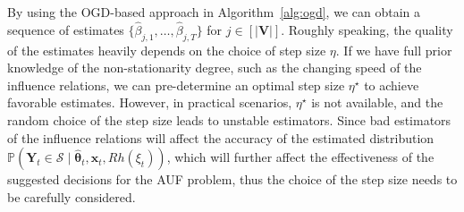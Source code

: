 \documentclass{article}
\theoremstyle{plain}
\theoremstyle{definition}
\theoremstyle{remark}
\def \x {\mathbf{x}}
\def \sB {\mathcal{B}}
\def \V {\mathbf{V}}
\def \sS {\mathcal{S}}
\def \Y {\mathbf{Y}}
\def \PA {\operatorname{PA}}
\def \V {\mathbf{V}}
\begin{document}
By using the OGD-based approach in Algorithm~\ref{alg:ogd}, we can obtain a sequence of estimates $\{\hat{\beta}_{j, 1}, \ldots, \hat{\beta}_{j, T}\}$ for $j\in[|\V|]$. 
Roughly speaking, the quality of the estimates heavily depends on the choice of step size $\eta$. 
If we have full prior knowledge of the non-stationarity degree, such as the changing speed of the influence relations, 
we can pre-determine an optimal step size $\eta^\star$ to achieve favorable estimates. 
However, in practical scenarios, $\eta^\star$ is not available, and the random choice of the step size leads to unstable estimators. 
Since bad estimators of the influence relations will affect the accuracy of the estimated distribution $\mathbb{P}(\Y_t\in\sS \mid \hat{\bm{\theta}}_t, \x_t, Rh(\xi_t))$, 
which will further affect the effectiveness of the suggested decisions for the AUF problem, thus the choice of the step size needs to be carefully considered.
\end{document}
